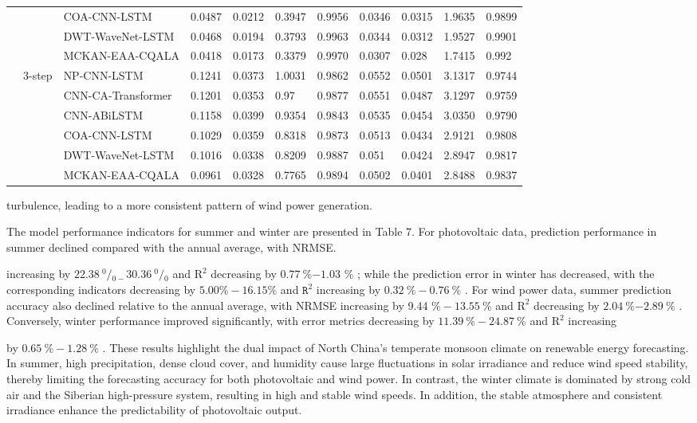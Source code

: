 \documentclass[
  10
]{article}
\begin{document}
{\begin{longtable}[]{@{}lllllllllll@{}}
& & COA-CNN-LSTM & 0.0487 & 0.0212 & 0.3947 & 0.9956 & 0.0346 & 0.0315 &
1.9635 & 0.9899 \\
& & DWT-WaveNet-LSTM & 0.0468 & 0.0194 & 0.3793 & 0.9963 & 0.0344 &
0.0312 & 1.9527 & 0.9901 \\
& & MCKAN-EAA-CQALA & 0.0418 & 0.0173 & 0.3379 & 0.9970 & 0.0307 & 0.028
& 1.7415 & 0.992 \\
& \multirow{6}{*}{3-step} & NP-CNN-LSTM & 0.1241 & 0.0373 & 1.0031 &
0.9862 & 0.0552 & 0.0501 & 3.1317 & 0.9744 \\
& & CNN-CA-Transformer & 0.1201 & 0.0353 & 0.97 & 0.9877 & 0.0551 &
0.0487 & 3.1297 & 0.9759 \\
& & CNN-ABiLSTM & 0.1158 & 0.0399 & 0.9354 & 0.9843 & 0.0535 & 0.0454 &
3.0350 & 0.9790 \\
& & COA-CNN-LSTM & 0.1029 & 0.0359 & 0.8318 & 0.9873 & 0.0513 & 0.0434 &
2.9121 & 0.9808 \\
& & DWT-WaveNet-LSTM & 0.1016 & 0.0338 & 0.8209 & 0.9887 & 0.051 &
0.0424 & 2.8947 & 0.9817 \\
& & MCKAN-EAA-CQALA & 0.0961 & 0.0328 & 0.7765 & 0.9894 & 0.0502 &
0.0401 & 2.8488 & 0.9837 \\
\end{longtable}
}

turbulence, leading to a more consistent pattern of wind power
generation.

The model performance indicators for summer and winter are presented in
Table 7. For photovoltaic data, prediction performance in summer
declined compared with the annual average, with NRMSE.

increasing by
\(2 2 . 3 8 \ { } ^ { 0 } / { } _ { 0 - } 3 0 . 3 6 \ { } ^ { 0 } / { } _ { 0 }\)
and \(\mathrm { R } ^ { 2 }\) decreasing by
\(0 . 7 7 \ \% { - 1 . 0 3 }\) \(\%\) ; while the prediction error in
winter has decreased, with the corresponding indicators decreasing by
\(5 . 0 0 \% - 1 6 . 1 5 \%\) and \(\mathtt { R } ^ { 2 }\) increasing
by \(0 . 3 2 \ \% - 0 . 7 6 \ \%\) . For wind power data, summer
prediction accuracy also declined relative to the annual average, with
NRMSE increasing by 9.44 \(\% - 1 3 . 5 5 ~ \%\) and
\(\mathrm { R } ^ { 2 }\) decreasing by
\(2 . 0 4 ~ \% { - 2 . 8 9 } ~ \%\) . Conversely, winter performance
improved significantly, with error metrics decreasing by
\(1 1 . 3 9 \ { \% } - 2 4 . 8 7 \ { \% }\) and
\(\mathrm { R } ^ { 2 }\) increasing

by \(0 . 6 5 ~ \% - 1 . 2 8 ~ \%\) . These results highlight the dual
impact of North China's temperate monsoon climate on renewable energy
forecasting. In summer, high precipitation, dense cloud cover, and
humidity cause large fluctuations in solar irradiance and reduce wind
speed stability, thereby limiting the forecasting accuracy for both
photovoltaic and wind power. In contrast, the winter climate is
dominated by strong cold air and the Siberian high-pressure system,
resulting in high and stable wind speeds. In addition, the stable
atmosphere and consistent irradiance enhance the predictability of
photovoltaic output.
\end{document}
